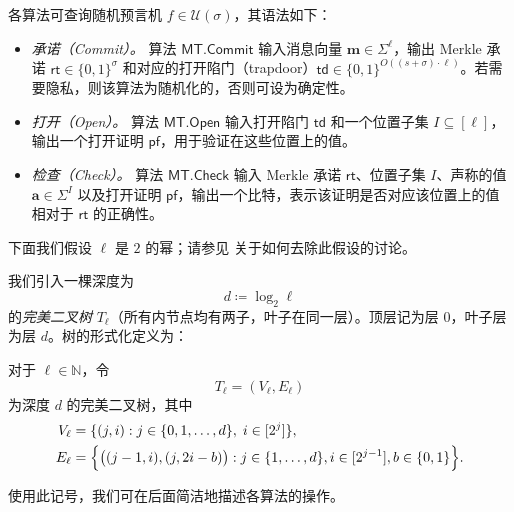 \documentclass[american,singlepageview]{snargs-book-zh}
\newcommand{\Bits}{\{0,1\}}
\newcommand{\DefineEqual}{\coloneqq}
\newcommand{\Naturals}{\mathbb{N}}
\newcommand{\ProtoAlphabet}{\Sigma}
\newcommand{\ROFunction}{f}
\newcommand{\RODistribution}[1]{\mathcal{U}(#1)}
\newcommand{\ROOutputSize}{\sigma}
\newcommand{\CMMessageLength}{\ell}
\newcommand{\MTGraph}{T}
\newcommand{\MTVertexSet}{V}
\newcommand{\MTEdgeSet}{E}
\newcommand{\MTDepth}{d}
\newcommand{\MTLayer}{j}
\newcommand{\MTSymbol}{\mathsf{MT}}
\newcommand{\MTCommit}{\MTSymbol.\mathsf{Commit}}
\newcommand{\MTOpen}{\MTSymbol.\mathsf{Open}}
\newcommand{\MTCheck}{\MTSymbol.\mathsf{Check}}
\newcommand{\MTMessageLength}{\CMMessageLength}
\newcommand{\MTSaltSize}{s}
\newcommand{\MTAlphabet}{\ProtoAlphabet}
\newcommand{\MTCommitment}{\mathsf{rt}}
\newcommand{\MTTrapdoor}{\mathsf{td}}
\newcommand{\MTProof}{\mathsf{pf}}
\newcommand{\MTMessageIndex}{i}
\newcommand{\MTMessageIndexSet}{I}
\newcommand{\MTMessageEntry}{m}
\newcommand{\MTMessageVector}{\mathbf{\MTMessageEntry}}
\newcommand{\MTMessageSubVector}{\mathbf{a}}
\begin{document}
各算法可查询随机预言机 $\ROFunction\in\RODistribution{\ROOutputSize}$，其语法如下：
\begin{itemize}
  \item \emph{承诺（Commit）。} 算法 $\MTCommit$ 输入消息向量 $\MTMessageVector\in\MTAlphabet^{\MTMessageLength}$，输出 Merkle 承诺 $\MTCommitment\in\Bits^{\ROOutputSize}$ 和对应的打开陷门（trapdoor）$\MTTrapdoor\in\Bits^{O((\MTSaltSize+\ROOutputSize)\cdot\MTMessageLength)}$。若需要隐私，则该算法为随机化的，否则可设为确定性。
  \item \emph{打开（Open）。} 算法 $\MTOpen$ 输入打开陷门 $\MTTrapdoor$ 和一个位置子集 $\MTMessageIndexSet\subseteq[\MTMessageLength]$，输出一个打开证明 $\MTProof$，用于验证在这些位置上的值。
  \item \emph{检查（Check）。} 算法 $\MTCheck$ 输入 Merkle 承诺 $\MTCommitment$、位置子集 $\MTMessageIndexSet$、声称的值 $\MTMessageSubVector\in\MTAlphabet^{\MTMessageIndexSet}$ 以及打开证明 $\MTProof$，输出一个比特，表示该证明是否对应该位置上的值相对于 $\MTCommitment$ 的正确性。
\end{itemize}

下面我们假设 $\MTMessageLength$ 是 $2$ 的幂；请参见  关于如何去除此假设的讨论。

 我们引入一棵深度为
\[
\MTDepth \DefineEqual \log_2 \MTMessageLength
\]
的\emph{完美二叉树} $\MTGraph_{\MTMessageLength}$（所有内节点均有两子，叶子在同一层）。顶层记为层 $0$，叶子层为层 $\MTDepth$。树的形式化定义为：

\begin{definition}
\label{definition:mt-graph}
对于 $\MTMessageLength\in\Naturals$，令
\[
\MTGraph_{\MTMessageLength}=(\MTVertexSet_{\MTMessageLength},\MTEdgeSet_{\MTMessageLength})
\]
为深度 $\MTDepth$ 的完美二叉树，其中
\begin{align*}
\MTVertexSet_{\MTMessageLength}&=\{(\MTLayer,\MTMessageIndex):\MTLayer\in\{0,1,\dots,\MTDepth\},\;\MTMessageIndex\in[2^{\MTLayer}]\},\\
\MTEdgeSet_{\MTMessageLength}&=\Bigl\{\bigl((\MTLayer-1,\MTMessageIndex),(\MTLayer,2\MTMessageIndex-b)\bigr):\MTLayer\in\{1,\dots,\MTDepth\},\MTMessageIndex\in[2^{\MTLayer-1}],b\in\{0,1\}\Bigr\}.
\end{align*}
\end{definition}

使用此记号，我们可在后面简洁地描述各算法的操作。
\end{document}
